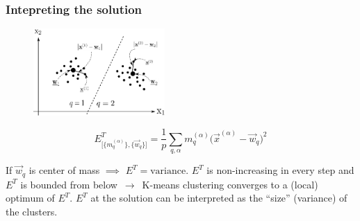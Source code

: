 \begin{frame} \frametitle{Intepreting the solution}
\begin{figure}[h]
\includegraphics[width=5.0cm]{img/section4_fig2_withincluster}
\end{figure}
$$
	E_{ \big[ \big\{ m_q^{(\alpha)} \big\}, \big\{ \vec{w}_q \big\} 
		\big] }^T = \frac{1}{p} \sum\limits_{q,\alpha} m_q^{(\alpha)}
		\big( \vec{x}^{(\alpha)} - \vec{w}_q \big)^2
$$
\begin{itemize}
 \itR If $\vec{w}_q$ is center of mass $\implies$ $E^T = \mathrm{variance}$.
 \itR $E^T$ is non-increasing in every step and $E^T$ is bounded from below $\,\to\,$ K-means clustering converges to a (local) optimum of $E^T$. 
\itR $E^T$ at the solution can be interpreted as the ``size'' (variance) of the clusters.
\end{itemize} 
\end{frame}

